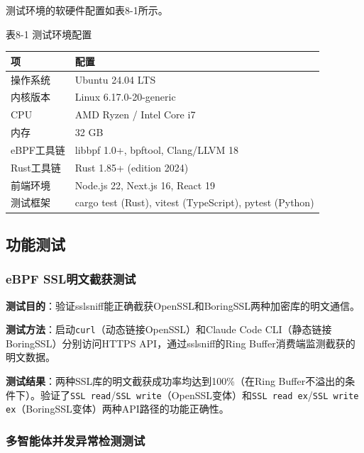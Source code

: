 \documentclass[a4paper]{ctexart}
\makeatletter
\renewcommand{\_}{%
  \ifmmode
    \nfss@text{\textunderscore}%
  \else
    \textunderscore\discretionary{}{}{}%
  \fi}
\makeatother
\begin{document}
测试环境的软硬件配置如表8-1所示。


{\centering\small
表8-1 测试环境配置\par
\vspace{3pt}
\setlength{\tabcolsep}{6pt}
\renewcommand{\arraystretch}{1.1}
\begin{tabular}{l l}
\hline
\textbf{项} & \textbf{配置} \\
\hline
操作系统 & Ubuntu 24.04 LTS \\
\hline
内核版本 & Linux 6.17.0-20-generic \\
\hline
CPU & AMD Ryzen / Intel Core i7 \\
\hline
内存 & 32 GB \\
\hline
eBPF工具链 & libbpf 1.0+, bpftool, Clang/LLVM 18 \\
\hline
Rust工具链 & Rust 1.85+ (edition 2024) \\
\hline
前端环境 & Node.js 22, Next.js 16, React 19 \\
\hline
测试框架 & cargo test (Rust), vitest (TypeScript), pytest (Python) \\
\hline
\end{tabular}
\par}


\subsection{功能测试}



\subsubsection{eBPF SSL明文截获测试}



\textbf{测试目的}：验证sslsniff能正确截获OpenSSL和BoringSSL两种加密库的明文通信。


\textbf{测试方法}：启动\texttt{curl}（动态链接OpenSSL）和Claude Code CLI（静态链接BoringSSL）分别访问HTTPS API，通过sslsniff的Ring Buffer消费端监测截获的明文数据。


\textbf{测试结果}：两种SSL库的明文截获成功率均达到100\%（在Ring Buffer不溢出的条件下）。验证了\texttt{SSL\_read}/\texttt{SSL\_write}（OpenSSL变体）和\texttt{SSL\_read\_ex}/\texttt{SSL\_write\_ex}（BoringSSL变体）两种API路径的功能正确性。


\subsubsection{多智能体并发异常检测测试}
\end{document}
